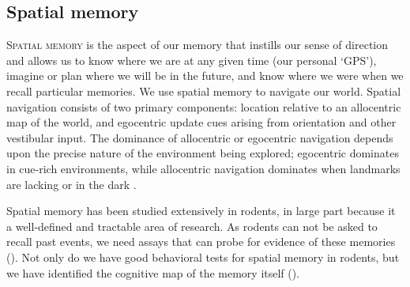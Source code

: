 \subsection{Spatial memory}\label{sec:intro:memory:spatial}
\textsc{Spatial memory} is the aspect of our memory that instills our sense of direction and allows us to know where we are at any given time (our personal `GPS'), imagine or plan where we will be in the future, and know where we were when we recall particular memories.
We use spatial memory to navigate our world.
Spatial navigation consists of two primary components: location relative to an allocentric map of the world, and egocentric update cues arising from orientation and other vestibular input.
The dominance of allocentric or egocentric navigation depends upon the precise nature of the environment being explored; egocentric dominates in cue-rich environments, while allocentric navigation dominates when landmarks are lacking or in the dark \citep{Knierim1998}\citep{Markus1994}.

Spatial memory has been studied extensively in rodents, in large part because it a well-defined and tractable area of research.
As rodents can not be asked to recall past events, we need assays that can probe for evidence of these memories ().
Not only do we have good behavioral tests for spatial memory in rodents, but we have identified the cognitive map of the memory itself ().

